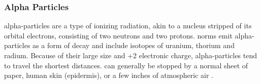 \documentclass[../../../../main.tex]{subfiles}
\begin{document}
%
    \subsubsection{Alpha Particles}%
    \label{sec:chapter-2:radiation-detection:types-of-radiation:alpha-particles}%
    \Glspl{alpha-particle} are a type of ionizing radiation, akin to a  nucleus stripped of its orbital electrons, consisting of two neutrons and two protons.
    \Glspl{norm} emit \glspl{alpha-particle} as a form of decay and include isotopes of uranium, thorium and radium.
    Because of their large size and +2 electronic charge, \glspl{alpha-particle} tend to travel the shortest distances.
     can generally be stopped by a normal sheet of paper, human skin (epidermis), or a few inches of atmospheric air \cite{book:Knoll_2010}.
\end{document}
